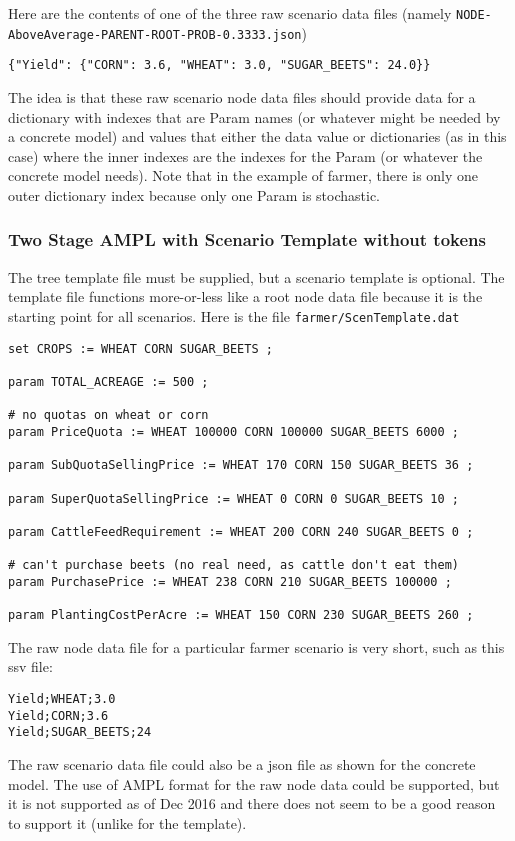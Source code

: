 \documentclass[12pt]{article}
\begin{document}
Here are the contents of one of the three raw scenario data files
(namely \verb|NODE-AboveAverage-PARENT-ROOT-PROB-0.3333.json|)

\begin{verbatim}
{"Yield": {"CORN": 3.6, "WHEAT": 3.0, "SUGAR_BEETS": 24.0}}
\end{verbatim}

The idea is that these raw scenario node data files should provide data
for a dictionary with indexes that are Param names (or whatever might
be needed by a concrete model) and values that either the data value
or dictionaries (as
in this case) where the inner indexes are the indexes for the Param (or
whatever the concrete model needs). Note that in the example of farmer,
there is only one outer dictionary index because only one Param is
stochastic.

\subsubsection{Two Stage AMPL with Scenario Template without tokens}

The tree template file must be supplied, but a scenario template
is optional. The template file functions more-or-less like a
root node data file because it is the starting point for all
scenarios. Here is the file \verb|farmer/ScenTemplate.dat|

\begin{verbatim}
set CROPS := WHEAT CORN SUGAR_BEETS ;

param TOTAL_ACREAGE := 500 ;

# no quotas on wheat or corn
param PriceQuota := WHEAT 100000 CORN 100000 SUGAR_BEETS 6000 ;

param SubQuotaSellingPrice := WHEAT 170 CORN 150 SUGAR_BEETS 36 ;

param SuperQuotaSellingPrice := WHEAT 0 CORN 0 SUGAR_BEETS 10 ;

param CattleFeedRequirement := WHEAT 200 CORN 240 SUGAR_BEETS 0 ;

# can't purchase beets (no real need, as cattle don't eat them)
param PurchasePrice := WHEAT 238 CORN 210 SUGAR_BEETS 100000 ;

param PlantingCostPerAcre := WHEAT 150 CORN 230 SUGAR_BEETS 260 ;

\end{verbatim}

The raw node data file for a particular farmer scenario
is very short, such as this ssv file:
\begin{verbatim}
Yield;WHEAT;3.0
Yield;CORN;3.6
Yield;SUGAR_BEETS;24
\end{verbatim}
The raw scenario data file could also be a json file as shown for the
concrete model. The use of AMPL format for the raw node data could be
supported, but it is not supported as of Dec 2016 and there does not seem
to be a good reason to support it (unlike for the template).
\end{document}
